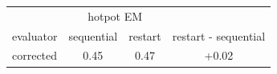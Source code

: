 \begin{tabular}{lccc}
\toprule
 & \multicolumn{2}{c}{hotpot EM} & \\
evaluator & sequential & restart & restart - sequential \\
\midrule
corrected & 0.45 & 0.47 & +0.02 \\
\bottomrule
\end{tabular}
